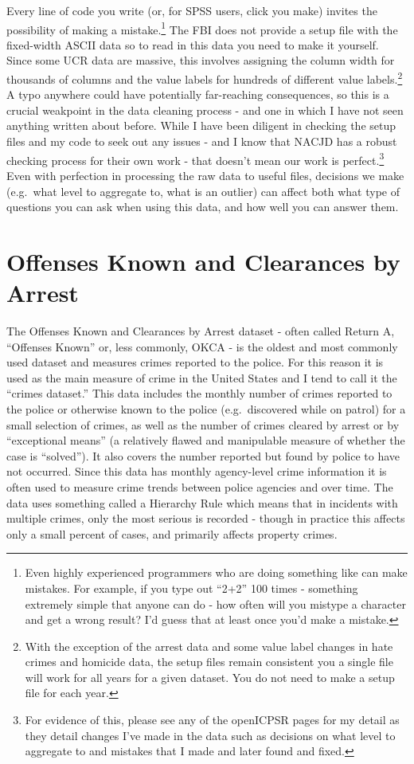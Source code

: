 \documentclass[
  12pt,
  openany]{book}
\begin{document}
Every line of code you write (or, for SPSS users, click you make) invites the possibility of making a mistake.\footnote{Even highly experienced programmers who are doing something like can make mistakes. For example, if you type out ``2+2'' 100 times - something extremely simple that anyone can do - how often will you mistype a character and get a wrong result? I'd guess that at least once you'd make a mistake.} The FBI does not provide a setup file with the fixed-width ASCII data so to read in this data you need to make it yourself. Since some UCR data are massive, this involves assigning the column width for thousands of columns and the value labels for hundreds of different value labels.\footnote{With the exception of the arrest data and some value label changes in hate crimes and homicide data, the setup files remain consistent you a single file will work for all years for a given dataset. You do not need to make a setup file for each year.} A typo anywhere could have potentially far-reaching consequences, so this is a crucial weakpoint in the data cleaning process - and one in which I have not seen anything written about before. While I have been diligent in checking the setup files and my code to seek out any issues - and I know that NACJD has a robust checking process for their own work - that doesn't mean our work is perfect.\footnote{For evidence of this, please see any of the openICPSR pages for my detail as they detail changes I've made in the data such as decisions on what level to aggregate to and mistakes that I made and later found and fixed.} Even with perfection in processing the raw data to useful files, decisions we make (e.g.~what level to aggregate to, what is an outlier) can affect both what type of questions you can ask when using this data, and how well you can answer them.

\hypertarget{offenses_known}{%
\chapter{Offenses Known and Clearances by Arrest}\label{offenses_known}}

The Offenses Known and Clearances by Arrest dataset - often called Return A, ``Offenses Known'' or, less commonly, OKCA - is the oldest and most commonly used dataset and measures crimes reported to the police. For this reason it is used as the main measure of crime in the United States and I tend to call it the ``crimes dataset.'' This data includes the monthly number of crimes reported to the police or otherwise known to the police (e.g.~discovered while on patrol) for a small selection of crimes, as well as the number of crimes cleared by arrest or by ``exceptional means'' (a relatively flawed and manipulable measure of whether the case is ``solved''). It also covers the number reported but found by police to have not occurred. Since this data has monthly agency-level crime information it is often used to measure crime trends between police agencies and over time. The data uses something called a Hierarchy Rule which means that in incidents with multiple crimes, only the most serious is recorded - though in practice this affects only a small percent of cases, and primarily affects property crimes.
\end{document}
